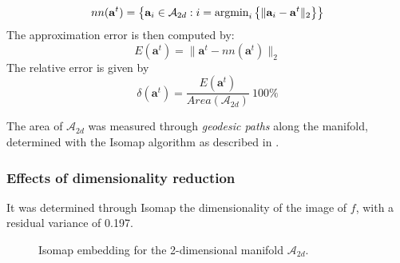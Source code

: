 \begin{equation}
nn(\mathbf{a}^{t} ) = \left\{ \mathbf{a}_{i} \in \mathcal{A}_{2d} : i = \mbox{argmin}_{i}\left\{ \| \mathbf{a}_{i} - \mathbf{a}^{t} \|_{2}\right\} \right\}
\end{equation}
The approximation error is then computed by:
\begin{equation}
E(\mathbf{a}^{t} ) = \| \mathbf{a}^{t} - nn(\mathbf{a}^{t}) \|_{2}
\end{equation}
The relative error is given by
\begin{equation}
\delta(\mathbf{a}^{t} ) = \frac{E(\mathbf{a}^{t} ) }{Area(\mathcal{A}_{2d} ) } \  100\% 
\end{equation}

The area of $\mathcal{A}_{2d}$ was measured through \emph{geodesic paths} along the manifold, determined with the Isomap algorithm as described in \cite{Tenenbaum00}. 

\subsubsection{Effects of dimensionality reduction}
It was determined through Isomap the dimensionality of the image of $f$, with a residual variance of 0.197.

\begin{figure}[!h]
 \centering
  \caption{Isomap embedding for the 2-dimensional manifold $\mathcal{A}_{2d}$.}
  \label{fig:isomap2D}
\end{figure}

